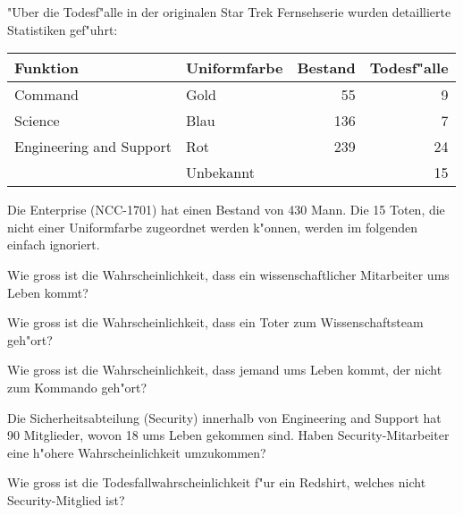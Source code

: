 "Uber die Todesf"alle in der originalen Star Trek Fernsehserie wurden
detaillierte Statistiken gef"uhrt:
\begin{center}
\begin{tabular}{|l|l|r|r|}
\hline
Funktion&Uniformfarbe&Bestand&Todesf"alle\\
\hline
Command&Gold&55&9\\
Science&Blau&136&7\\
Engineering and Support&Rot&239&24\\
&Unbekannt&&15\\
\hline
\end{tabular}
\end{center}
Die Enterprise (NCC-1701) hat einen Bestand von 430 Mann.
Die 15 Toten, die nicht einer Uniformfarbe zugeordnet werden k"onnen, werden
im folgenden einfach ignoriert.
\begin{teilaufgaben}
\item
Wie gross ist die Wahrscheinlichkeit, dass ein wissenschaftlicher Mitarbeiter
ums Leben kommt?
\item
Wie gross ist die Wahrscheinlichkeit, dass ein Toter zum Wissenschaftsteam
geh"ort?
\item
Wie gross ist die Wahrscheinlichkeit, dass jemand ums Leben kommt, der
nicht zum Kommando geh"ort?
\item 
Die Sicherheitsabteilung (Security) innerhalb von Engineering and Support
hat 90 Mitglieder, wovon 18 ums Leben gekommen sind.
Haben Security-Mitarbeiter eine h"ohere Wahrscheinlichkeit umzukommen?
\item
Wie gross ist die Todesfallwahrscheinlichkeit f"ur ein Redshirt, welches
nicht Security-Mitglied ist?
\end{teilaufgaben}


